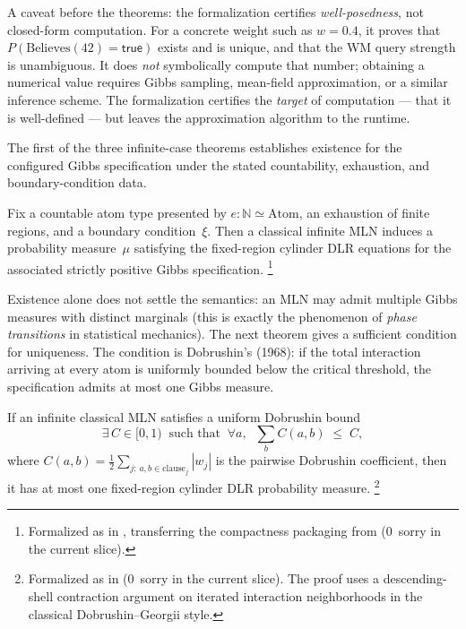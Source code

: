 \documentclass[11pt,openany]{report}
\begin{document}
A caveat before the theorems: the formalization certifies
\emph{well-posedness}, not closed-form computation.  For a concrete weight
such as $w=0.4$, it proves that $P(\mathrm{Believes}(42)=\mathsf{true})$
exists and is unique, and that the WM query strength is unambiguous.  It does
\emph{not} symbolically compute that number; obtaining a numerical value
requires Gibbs sampling, mean-field approximation, or a similar inference
scheme.  The formalization certifies the \emph{target} of computation --- that
it is well-defined --- but leaves the approximation algorithm to the runtime.

\medskip
\noindent
The first of the three infinite-case theorems establishes existence for the
configured Gibbs specification under the stated countability, exhaustion, and
boundary-condition data.

\begin{theorem}
\label{thm:infinite-mln-existence}
Fix a countable atom type presented by $e : \mathbb{N} \simeq \mathrm{Atom}$,
an exhaustion of finite regions, and a boundary condition~$\xi$.  Then a
classical infinite MLN induces a probability measure~$\mu$ satisfying the
fixed-region cylinder DLR equations for the associated strictly positive Gibbs
specification.%
\footnote{Formalized as
 in
,
transferring the compactness packaging from
(0~sorry in the current slice).}
\end{theorem}

\noindent
Existence alone does not settle the semantics: an MLN may admit multiple
Gibbs measures with distinct marginals (this is exactly the phenomenon of
\emph{phase transitions} in statistical mechanics).  The next theorem gives a
sufficient condition for uniqueness.  The condition is Dobrushin's (1968):
if the total interaction arriving at every atom is uniformly bounded below the
critical threshold, the specification admits at most one Gibbs measure.

\begin{theorem}
\label{thm:infinite-mln-uniqueness}
If an infinite classical MLN satisfies a uniform Dobrushin bound
\[
  \exists\, C \in [0,1) \;\;\text{such that}\;\;
  \forall a,\;\;
  \sum_b C(a,b) \;\le\; C,
\]
where $C(a,b) = \tfrac{1}{2}\sum_{j:\,a,b\in\mathrm{clause}_j}|w_j|$ is the
pairwise Dobrushin coefficient, then it has at most one fixed-region cylinder
DLR probability measure.%
\footnote{Formalized as
in 
(0~sorry in the current slice).  The proof uses a descending-shell
contraction argument on iterated interaction neighborhoods in the classical
Dobrushin--Georgii style.}
\end{theorem}
\end{document}
